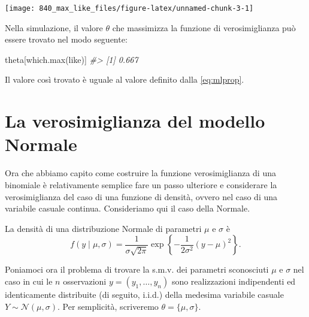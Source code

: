 \documentclass[
  10pt,
  italian,
  a4paper,
  extrafontsizes,onecolumn,openright
  ]{memoir}
\newenvironment{Shaded}{\begin{snugshade}}{\end{snugshade}}
\newcommand{\CommentTok}[1]{\textcolor[rgb]{0.56,0.35,0.01}{\textit{#1}}}
\newcommand{\FunctionTok}[1]{\textcolor[rgb]{0.00,0.00,0.00}{#1}}
\newcommand{\NormalTok}[1]{#1}
\theoremstyle{definition}
\theoremstyle{definition}
\theoremstyle{definition}
\theoremstyle{definition}
\theoremstyle{remark}
\begin{document}
\begin{center}\texttt{[image: 840\_max\_like\_files/figure-latex/unnamed-chunk-3-1]} \end{center}

Nella simulazione, il valore \(\theta\) che massimizza la funzione di verosimiglianza può essere trovato nel modo seguente:

\begin{Shaded}
\begin{Highlighting}[]
\NormalTok{theta[}\FunctionTok{which.max}\NormalTok{(like)]}
\CommentTok{\#\textgreater{} [1] 0.667}
\end{Highlighting}
\end{Shaded}

\noindent
Il valore così trovato è uguale al valore definito dalla \eqref{eq:mlprop}.

\hypertarget{la-verosimiglianza-del-modello-normale}{%
\section*{La verosimiglianza del modello Normale}\label{la-verosimiglianza-del-modello-normale}}

Ora che abbiamo capito come costruire la funzione verosimiglianza di una binomiale è relativamente semplice fare un passo ulteriore e considerare la verosimiglianza del caso di una funzione di densità, ovvero nel caso di una variabile casuale continua. Consideriamo qui il caso della Normale.

La densità di una distribuzione Normale di parametri \(\mu\) e \(\sigma\) è
\[
f(y \mid \mu, \sigma) = \frac{1}{\sigma \sqrt{2\pi}} \exp\left\{-\frac{1}{2\sigma^2}(y-\mu)^2\right\}.
\label{eq:gausslike}
\]

Poniamoci ora il problema di trovare la s.m.v. dei parametri sconosciuti \(\mu\) e \(\sigma\) nel caso in cui le \(n\) osservazioni \(y = (y_1, \dots, y_n)\) sono realizzazioni indipendenti ed identicamente distribuite (di seguito, i.i.d.) della medesima variabile casuale \(Y \sim \mathcal{N}(\mu, \sigma)\). Per semplicità, scriveremo \(\theta = \{\mu, \sigma\}.\)
\end{document}
